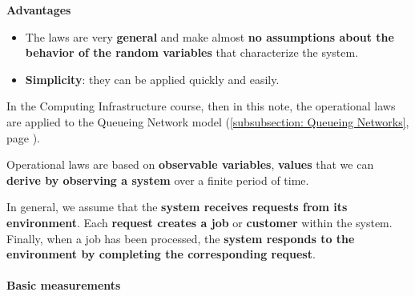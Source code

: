 \begin{flushleft}
	\textcolor{Green3}{ \textbf{Advantages}}
\end{flushleft}
\begin{itemize}
	\item The laws are very \textbf{general} and make almost \textbf{no assumptions about the behavior of the random variables} that characterize the system.
	\item \textbf{Simplicity}: they can be applied quickly and easily.
\end{itemize}
In the Computing Infrastructure course, then in this note, the operational laws are applied to the Queueing Network model (\ref{subsubsection: Queueing Networks}, page \pageref{subsubsection: Queueing Networks}).

\highspace
Operational laws are based on \textbf{observable variables}, \textbf{values} that we can \textbf{derive by observing a system} over a finite period of time.

\highspace
In general, we assume that the \textbf{system receives requests from its environment}. Each \textbf{request creates a job} or \textbf{customer} within the system. Finally, when a job has been processed, the \textbf{system responds to the environment by completing the corresponding request}.

\longline

\paragraph{Basic measurements}

